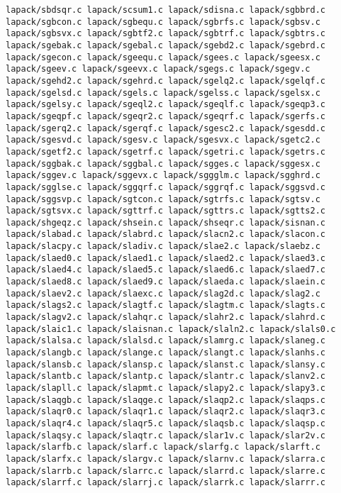 \documentclass[10pt,a4paper]{article}
\begin{document}
\begin{codeparchment}
\begin{lstlisting}
lapack/sbdsqr.c lapack/scsum1.c lapack/sdisna.c lapack/sgbbrd.c 
lapack/sgbcon.c lapack/sgbequ.c lapack/sgbrfs.c lapack/sgbsv.c 
lapack/sgbsvx.c lapack/sgbtf2.c lapack/sgbtrf.c lapack/sgbtrs.c 
lapack/sgebak.c lapack/sgebal.c lapack/sgebd2.c lapack/sgebrd.c 
lapack/sgecon.c lapack/sgeequ.c lapack/sgees.c lapack/sgeesx.c 
lapack/sgeev.c lapack/sgeevx.c lapack/sgegs.c lapack/sgegv.c 
lapack/sgehd2.c lapack/sgehrd.c lapack/sgelq2.c lapack/sgelqf.c 
lapack/sgelsd.c lapack/sgels.c lapack/sgelss.c lapack/sgelsx.c 
lapack/sgelsy.c lapack/sgeql2.c lapack/sgeqlf.c lapack/sgeqp3.c 
lapack/sgeqpf.c lapack/sgeqr2.c lapack/sgeqrf.c lapack/sgerfs.c 
lapack/sgerq2.c lapack/sgerqf.c lapack/sgesc2.c lapack/sgesdd.c
lapack/sgesvd.c lapack/sgesv.c lapack/sgesvx.c lapack/sgetc2.c 
lapack/sgetf2.c lapack/sgetrf.c lapack/sgetri.c lapack/sgetrs.c 
lapack/sggbak.c lapack/sggbal.c lapack/sgges.c lapack/sggesx.c 
lapack/sggev.c lapack/sggevx.c lapack/sggglm.c lapack/sgghrd.c 
lapack/sgglse.c lapack/sggqrf.c lapack/sggrqf.c lapack/sggsvd.c 
lapack/sggsvp.c lapack/sgtcon.c lapack/sgtrfs.c lapack/sgtsv.c 
lapack/sgtsvx.c lapack/sgttrf.c lapack/sgttrs.c lapack/sgtts2.c 
lapack/shgeqz.c lapack/shsein.c lapack/shseqr.c lapack/sisnan.c 
lapack/slabad.c lapack/slabrd.c lapack/slacn2.c lapack/slacon.c 
lapack/slacpy.c lapack/sladiv.c lapack/slae2.c lapack/slaebz.c 
lapack/slaed0.c lapack/slaed1.c lapack/slaed2.c lapack/slaed3.c
lapack/slaed4.c lapack/slaed5.c lapack/slaed6.c lapack/slaed7.c 
lapack/slaed8.c lapack/slaed9.c lapack/slaeda.c lapack/slaein.c 
lapack/slaev2.c lapack/slaexc.c lapack/slag2d.c lapack/slag2.c 
lapack/slags2.c lapack/slagtf.c lapack/slagtm.c lapack/slagts.c 
lapack/slagv2.c lapack/slahqr.c lapack/slahr2.c lapack/slahrd.c 
lapack/slaic1.c lapack/slaisnan.c lapack/slaln2.c lapack/slals0.c 
lapack/slalsa.c lapack/slalsd.c lapack/slamrg.c lapack/slaneg.c 
lapack/slangb.c lapack/slange.c lapack/slangt.c lapack/slanhs.c 
lapack/slansb.c lapack/slansp.c lapack/slanst.c lapack/slansy.c 
lapack/slantb.c lapack/slantp.c lapack/slantr.c lapack/slanv2.c 
lapack/slapll.c lapack/slapmt.c lapack/slapy2.c lapack/slapy3.c 
lapack/slaqgb.c lapack/slaqge.c lapack/slaqp2.c lapack/slaqps.c 
lapack/slaqr0.c lapack/slaqr1.c lapack/slaqr2.c lapack/slaqr3.c 
lapack/slaqr4.c lapack/slaqr5.c lapack/slaqsb.c lapack/slaqsp.c 
lapack/slaqsy.c lapack/slaqtr.c lapack/slar1v.c lapack/slar2v.c 
lapack/slarfb.c lapack/slarf.c lapack/slarfg.c lapack/slarft.c 
lapack/slarfx.c lapack/slargv.c lapack/slarnv.c lapack/slarra.c 
lapack/slarrb.c lapack/slarrc.c lapack/slarrd.c lapack/slarre.c 
lapack/slarrf.c lapack/slarrj.c lapack/slarrk.c lapack/slarrr.c 

\end{lstlisting}
\end{codeparchment}
\end{document}
